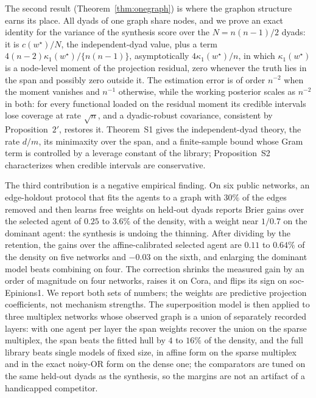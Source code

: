 \documentclass[12pt]{article}
\newcommand{\wstar}{w^{\star}}
\begin{document}
The second result (Theorem~\ref{thm:onegraph}) is where the graphon structure earns its place. All dyads of one graph share nodes, and we prove an exact identity for the variance of the synthesis score over the $N=n(n-1)/2$ dyads: it is $c(\wstar)/N$, the independent-dyad value, plus a term $4(n-2)\kappa_1(\wstar)/\{n(n-1)\}$, asymptotically $4\kappa_1(\wstar)/n$, in which $\kappa_1(\wstar)$ is a node-level moment of the projection residual, zero whenever the truth lies in the span and possibly zero outside it. The estimation error is of order $n^{-2}$ when the moment vanishes and $n^{-1}$ otherwise, while the working posterior scales as $n^{-2}$ in both: for every functional loaded on the residual moment its credible intervals lose coverage at rate $\sqrt n$, and a dyadic-robust covariance, consistent by Proposition~$2'$, restores it. Theorem~S1 gives the independent-dyad theory, the rate $d/m$, its minimaxity over the span, and a finite-sample bound whose Gram term is controlled by a leverage constant of the library; Proposition~S2 characterizes when credible intervals are conservative.

The third contribution is a negative empirical finding. On six public networks, an edge-holdout protocol that fits the agents to a graph with $30\%$ of the edges removed and then learns free weights on held-out dyads reports Brier gains over the selected agent of $0.25$ to $3.6\%$ of the density, with a weight near $1/0.7$ on the dominant agent: the synthesis is undoing the thinning. After dividing by the retention, the gains over the affine-calibrated selected agent are $0.11$ to $0.64\%$ of the density on five networks and $-0.03$ on the sixth, and enlarging the dominant model beats combining on four. The correction shrinks the measured gain by an order of magnitude on four networks, raises it on Cora, and flips its sign on soc-Epinions1. We report both sets of numbers; the weights are predictive projection coefficients, not mechanism strengths. The superposition model is then applied to three multiplex networks whose observed graph is a union of separately recorded layers: with one agent per layer the span weights recover the union on the sparse multiplex, the span beats the fitted hull by $4$ to $16\%$ of the density, and the full library beats single models of fixed size, in affine form on the sparse multiplex and in the exact noisy-OR form on the dense one; the comparators are tuned on the same held-out dyads as the synthesis, so the margins are not an artifact of a handicapped competitor.
\end{document}
